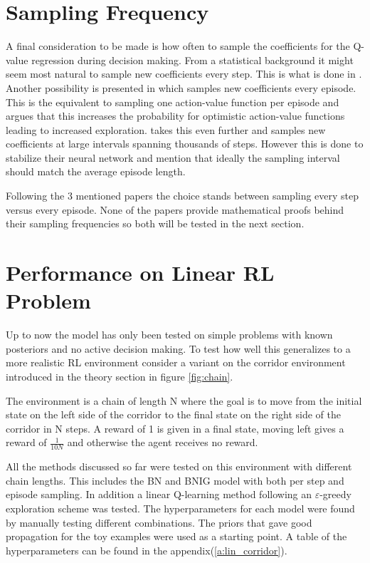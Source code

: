 \section{Sampling Frequency}

A final consideration to be made is how often to sample the coefficients for the Q-value regression during decision making. From a statistical background it might seem most natural to sample new coefficients every step. This is what is done in \cite{donoghue_2017}. Another possibility is presented in \cite{osband_2018} which samples new coefficients every episode. This is the equivalent to sampling one action-value function per episode and \cite{osband_2018} argues that this increases the probability for optimistic action-value functions leading to increased exploration. \cite{azziz_2018} takes this even further and samples new coefficients at large intervals spanning thousands of steps. However this is done to stabilize their neural network and mention that ideally the sampling interval should match the average episode length.

Following the 3 mentioned papers the choice stands between sampling every step versus every episode. None of the papers provide mathematical proofs behind their sampling frequencies so both will be tested in the next section.

\section{Performance on Linear RL Problem}

Up to now the model has only been tested on simple problems with known posteriors and no active decision making. To test how well this generalizes to a more realistic RL environment consider a variant on the corridor environment introduced in the theory section in figure \ref{fig:chain}.

The environment is a chain of length N where the goal is to move from the initial state on the left side of the corridor to the final state on the right side of the corridor in N steps. A reward of 1 is given in a final state, moving left gives a reward of $\frac{1}{10N}$ and otherwise the agent receives no reward.

All the methods discussed so far were tested on this environment with different chain lengths. This includes the BN and BNIG model with both per step and episode sampling. In addition a linear Q-learning method following an $\varepsilon$-greedy exploration scheme was tested. The hyperparameters for each model were found by manually testing different combinations. The priors that gave good propagation for the toy examples were used as a starting point. A table of the hyperparameters can be found in the appendix(\ref{a:lin_corridor}).

